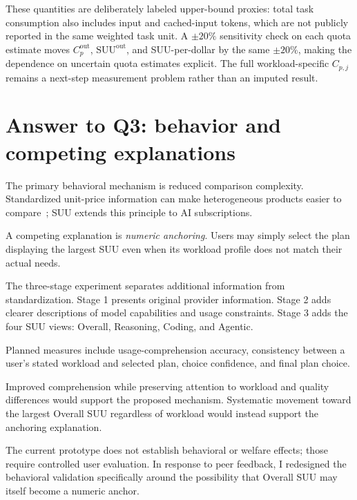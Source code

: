 \documentclass[sigconf,nonacm]{acmart}
\begin{document}
These quantities are deliberately labeled upper-bound proxies: total task
consumption also includes input and cached-input tokens, which are not publicly
reported in the same weighted task unit. A $\pm20\%$ sensitivity check on each
quota estimate moves $C_p^{\mathrm{out}}$, $\mathrm{SUU}^{\mathrm{out}}$, and
SUU-per-dollar by the same $\pm20\%$, making the dependence on uncertain quota
estimates explicit. The full workload-specific $C_{p,j}$ remains a next-step
measurement problem rather than an imputed result.



\section{Answer to Q3: behavior and competing explanations}

The primary behavioral mechanism is reduced comparison complexity.
Standardized unit-price information can make heterogeneous products easier to
compare~\cite{yao2016}; SUU extends this principle to AI subscriptions.

\vspace{0.5em}

A competing explanation is \emph{numeric anchoring}.
Users may simply select the plan displaying the largest SUU even when its
workload profile does not match their actual needs.

\vspace{0.5em}

The three-stage experiment separates additional information from
standardization.
Stage 1 presents original provider information.
Stage 2 adds clearer descriptions of model capabilities and usage constraints.
Stage 3 adds the four SUU views:
Overall, Reasoning, Coding, and Agentic.

\vspace{0.5em}

Planned measures include usage-comprehension accuracy,
consistency between a user's stated workload and selected plan,
choice confidence,
and final plan choice.

Improved comprehension while preserving attention to workload and quality
differences would support the proposed mechanism.
Systematic movement toward the largest Overall SUU regardless of workload
would instead support the anchoring explanation.

The current prototype does not establish behavioral or welfare effects;
those require controlled user evaluation. In response to peer feedback, I
redesigned the behavioral validation specifically around the possibility that
Overall SUU may itself become a numeric anchor.
\end{document}
